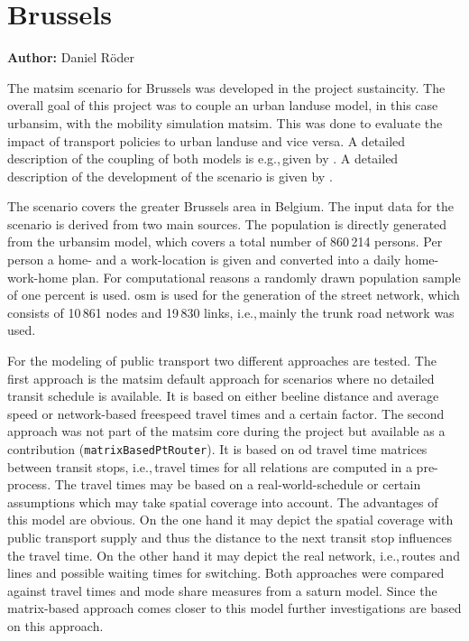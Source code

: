 \section{Brussels}
\label{sec:brussels}
\hfill \textbf{Author:} Daniel Röder

The \gls{matsim} scenario for Brussels was developed in the project \gls{sustaincity}. The overall goal of this project was to couple an urban landuse model, in this case \gls{urbansim}, with the mobility simulation \gls{matsim}. This was done to evaluate the impact of transport policies to urban landuse and vice versa. A detailed description of the coupling of both models is e.g.,\,given by \citet{Nicolai2013PhD}. A detailed description of the development of the scenario is given by \citet{RoederNagel2013SketchPlanningBrussels}.

The scenario covers the greater Brussels area in Belgium. The input data for the scenario is derived from two main sources. The population is directly generated from the \gls{urbansim} model, which covers a total number of 860\,214 persons. Per person a home- and a work-location is given and converted into a daily home-work-home plan. For computational reasons a randomly drawn population sample of one percent is used. \gls{osm} is used for the generation of the street network, which consists of 10\,861 nodes and 19\,830 links, i.e.,\,mainly the trunk road network was used.

For the modeling of public transport two different approaches are tested. The first approach is the \gls{matsim} default approach for scenarios where no detailed transit schedule is available. It is based on either beeline distance and average speed or network-based freespeed travel times and a certain factor. The second approach was not part of the \gls{matsim} core during the project but available as a contribution (\lstinline|matrixBasedPtRouter|). It is based on \gls{od} travel time matrices between transit stops, i.e.,\,travel times for all relations are computed in a pre-process. The travel times may be based on a real-world-schedule or certain assumptions which may take spatial coverage into account. The advantages of this model are obvious. On the one hand it may depict the spatial coverage with public transport supply and thus the distance to the next transit stop influences the travel time. On the other hand it may depict the real network, i.e.,\,routes and lines and possible waiting times for switching. Both approaches were compared against travel times and mode share measures from a \gls{saturn} model. Since the matrix-based approach comes closer to this model further investigations are based on this 
approach.


